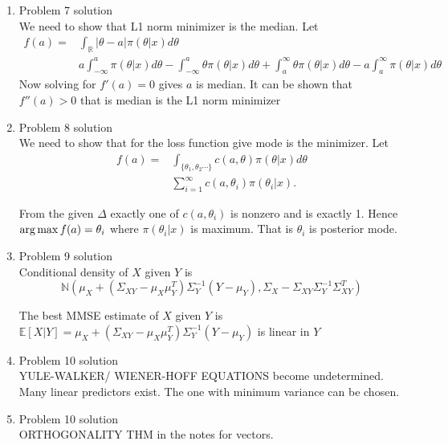 \documentclass[a4paper,english,10pt]{article}
\begin{document}
\begin{enumerate}
 
\item{Problem 7 solution}\\ 

We need to show that L1 norm minimizer is the median. Let
\begin{align*}
 f(a)= & \int_{\mathbb{R}}|\theta-a| \pi(\theta|x) d\theta \\
  & a \int_{-\infty}^{a} \pi(\theta|x) d\theta- \int_{-\infty}^{a} \theta \pi(\theta|x) d\theta
+\int_{a}^{\infty} \theta \pi(\theta|x) d\theta - a \int_{a}^{\infty} \pi(\theta|x) d\theta
\end{align*}
Now solving for $f'(a)=0$ gives $a$ is median. It can be shown that  $f''(a)>0$ that is median
is the L1 norm minimizer

\item{Problem 8 solution}\\ 
We need to show that for the loss function give mode is the minimizer. Let
\begin{align*}
f(a)= & \int_{\{ \theta_1, \theta_2 \cdots \}}c(a,\theta) \pi(\theta|x) d\theta \\
      & \sum_{i=1}^{\infty}c(a,\theta_i) \pi(\theta_i|x). 
\end{align*}

From the given $\Delta$ exactly one of $c(a,\theta_i)$ is nonzero and is exactly 1. Hence
$\operatorname*{arg\,max} f(a) = \theta_i$ where $\pi(\theta_i|x)$ is maximum. That is $\theta_i$ is posterior mode. 

\item{Problem 9 solution}\\ 
Conditional density of $X$ given $Y$ is 
$$\mathbb{N}(\mu_{X}+(\Sigma_{XY}-\mu_{X}\mu_{Y}^T)\Sigma_{Y}^{-1}(Y-\mu_{Y}), \Sigma_{X}-\Sigma_{XY}\Sigma_{Y}^{-1}\Sigma_{XY}^{T})$$

The best MMSE estimate of $X$ given $Y$ is $\mathbb{E}[X|Y]=\mu_{X}+(\Sigma_{XY}-\mu_{X}\mu_{Y}^T)\Sigma_{Y}^{-1}(Y-\mu_{Y})$ is 
linear in $Y$

\item{Problem 10 solution}\\
 
 YULE-WALKER/ WIENER-HOFF EQUATIONS become undetermined. Many linear predictors exist. The one
 with minimum variance can be chosen.
 
\item{Problem 10 solution}\\

ORTHOGONALITY THM in the notes for vectors.

\end{enumerate}
\end{document}

